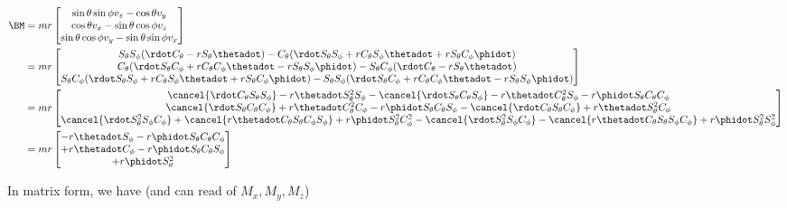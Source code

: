 \begin{align*}
\BM &=
m r
\begin{bmatrix}
\sin\theta \sin\phi v_z - \cos\theta v_y \\
\cos\theta v_x - \sin\theta \cos\phi v_z \\
\sin\theta \cos\phi v_y - \sin\theta \sin\phi v_x
\end{bmatrix} \\
&=
m r
\begin{bmatrix}
S_\theta S_\phi (\rdot C_\theta -r S_\theta \thetadot) - C_\theta (\rdot S_\theta S_\phi + r C_\theta S_\phi \thetadot + r S_\theta C_\phi \phidot) \\
C_\theta (\rdot S_\theta C_\phi + r C_\theta C_\phi \thetadot - r S_\theta S_\phi \phidot) - S_\theta C_\phi (\rdot C_\theta -r S_\theta \thetadot) \\
S_\theta C_\phi (\rdot S_\theta S_\phi + r C_\theta S_\phi \thetadot + r S_\theta C_\phi \phidot) - S_\theta S_\phi (\rdot S_\theta C_\phi + r C_\theta C_\phi \thetadot - r S_\theta S_\phi \phidot)
\end{bmatrix} \\
&=
m r
\begin{bmatrix}
\cancel{\rdot C_\theta S_\theta S_\phi }
- r \thetadot S_\theta^2 S_\phi 
- \cancel{\rdot S_\theta C_\theta S_\phi }
- r \thetadot C_\theta^2 S_\phi 
- r \phidot S_\theta C_\theta C_\phi 
\\
\cancel{\rdot S_\theta C_\theta C_\phi }
+ r \thetadot C_\theta^2 C_\phi 
- r \phidot S_\theta C_\theta S_\phi 
-\cancel{\rdot C_\theta S_\theta C_\phi }
+r \thetadot S_\theta^2 C_\phi 
\\
\cancel{\rdot S_\theta^2 S_\phi C_\phi }
+ \cancel{r \thetadot C_\theta S_\theta C_\phi S_\phi }
+ r \phidot S_\theta^2 C_\phi^2 
- \cancel{\rdot S_\theta^2 S_\phi C_\phi }
- \cancel{r \thetadot C_\theta S_\theta S_\phi C_\phi }
+ r \phidot S_\theta^2 S_\phi^2
\end{bmatrix} \\
&=
m r
\begin{bmatrix}
- r \thetadot S_\phi 
- r \phidot S_\theta C_\theta C_\phi 
\\
+ r \thetadot C_\phi 
- r \phidot S_\theta C_\theta S_\phi 
\\
+ r \phidot S_\theta^2 
\end{bmatrix} \\
\end{align*}

In matrix form, we have (and can read of $M_x, M_y, M_z$)

